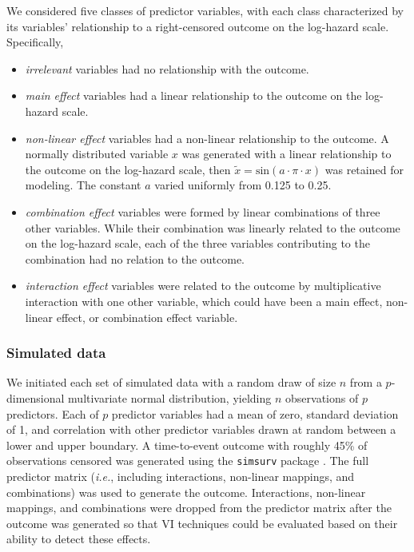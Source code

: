 \documentclass[12pt]{article}\usepackage[]{graphicx}\usepackage[]{xcolor}
\newcommand{\ie}{\textit{i.e.}}
\begin{document}
We considered five classes of predictor variables, with each class characterized by its variables' relationship to a right-censored outcome on the log-hazard scale. Specifically, \begin{itemize}
\item \textit{irrelevant} variables had no relationship with the outcome.
\item \textit{main effect} variables had a linear relationship to the outcome on the log-hazard scale.
\item \textit{non-linear effect} variables had a non-linear relationship to the outcome. A normally distributed variable $x$ was generated with a linear relationship to the outcome on the log-hazard scale, then $\tilde{x} = \text{sin}(a \cdot \pi \cdot x)$ was retained for modeling. The constant $a$ varied uniformly from 0.125 to 0.25.
\item \textit{combination effect} variables were formed by linear combinations of three other variables. While their combination was linearly related to the outcome on the log-hazard scale, each of the three variables contributing to the combination had no relation to the outcome.
\item \textit{interaction effect} variables were related to the outcome by multiplicative interaction with one other variable, which could have been a main effect, non-linear effect, or combination effect variable.
\end{itemize}

\subsubsection{Simulated data} \label{sec:data_sim}

We initiated each set of simulated data with a random draw of size $n$ from a $p$-dimensional multivariate normal distribution, yielding $n$ observations of $p$ predictors. Each of $p$ predictor variables had a mean of zero, standard deviation of 1, and correlation with other predictor variables drawn at random between a lower and upper boundary. A time-to-event outcome with roughly 45\% of observations censored was generated using the \texttt{simsurv} package \citep{simsurv, simsurv_paper}. The full predictor matrix (\ie, including interactions, non-linear mappings, and combinations) was used to generate the outcome. Interactions, non-linear mappings, and combinations were dropped from the predictor matrix after the outcome was generated so that VI techniques could be evaluated based on their ability to detect these effects.
\end{document}
